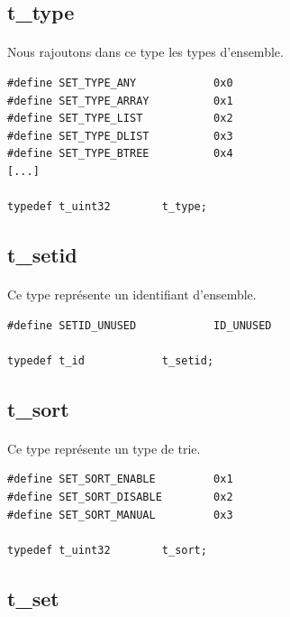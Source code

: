 \documentclass[10pt,a4wide]{article}
\begin{document}
\subsection{t\_type}

\paragraph{}

Nous rajoutons dans ce type les types d'ensemble.

\begin{verbatim}
#define SET_TYPE_ANY            0x0
#define SET_TYPE_ARRAY          0x1
#define SET_TYPE_LIST           0x2
#define SET_TYPE_DLIST          0x3
#define SET_TYPE_BTREE          0x4
[...]

typedef t_uint32        t_type;
\end{verbatim}

\subsection{t\_setid}

\paragraph{}

Ce type repr\'esente un identifiant d'ensemble.

\begin{verbatim}
#define SETID_UNUSED            ID_UNUSED

typedef t_id            t_setid;
\end{verbatim}

\subsection{t\_sort}

\paragraph{}

Ce type repr\'esente un type de trie.

\begin{verbatim}
#define SET_SORT_ENABLE         0x1
#define SET_SORT_DISABLE        0x2
#define SET_SORT_MANUAL         0x3

typedef t_uint32        t_sort;
\end{verbatim}

\subsection{t\_set}
\end{document}
